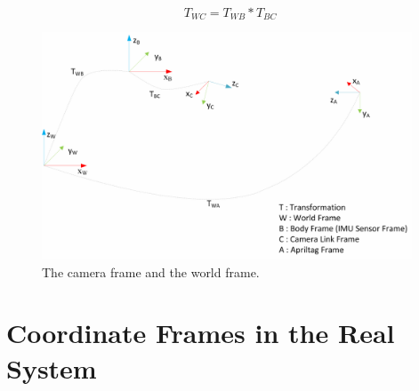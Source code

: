  \begin{equation}
 \label{eq:TWC}
 T_{WC} = T_{WB} * T_{BC}
 \end{equation}  
 
  \begin{figure}
     \centering
     \includegraphics[width=0.98\textwidth]{images/coordinate_frame_representation_high_res.pdf}
     \caption{The camera frame and the world frame.}
     \label{pics:mavcoordinateframe}
  \end{figure}
  
  
\section{Coordinate Frames in the Real System}
\label{sec: CoordinatesinRealSystem}
  